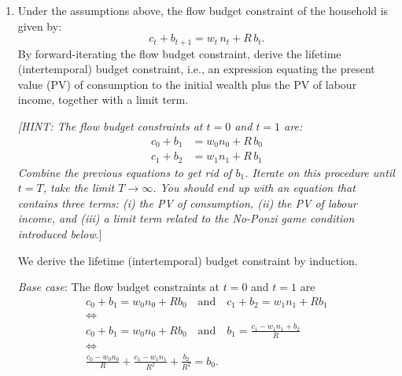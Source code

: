 \documentclass[dvipsnames,11pt]{article}
\begin{document}
        \begin{enumerate}
            \item Under the assumptions above, the flow budget constraint of the household is given by: 
            \begin{equation*}
                c_t + b_{t+1} = w_t\,n_t + R\,b_t .
            \end{equation*}
            By forward-iterating the flow budget constraint, derive the lifetime (intertemporal) budget constraint, i.e., an expression equating the present value (PV) of consumption to the initial wealth plus the PV of labour income, together with a limit term. 

            \textit{[HINT: The flow budget constraints at $t=0$ and $t=1$ are:
            \begin{align*}
            c_{0} + b_1  &= w_0 n_0 + R\,b_{0} 	\\
            c_{1} + b_2  &= w_1 n_1 + R\,b_{1}
            \end{align*}
            Combine the previous equations to get rid of $b_{1}$. Iterate on this
            procedure until $t=T$, take the limit $T\to\infty$. You should end up with an equation that contains three terms: \textit{(i)} the PV of consumption, \textit{(ii)} the PV of labour income, and \textit{(iii)} a limit term related to the No-Ponzi game condition introduced below}.]

            \begin{solution}

               We derive the lifetime (intertemporal) budget constraint by induction. 

\textit{Base case}: The flow budget constraints at $t=0$ and $t=1$ are
\begin{gather*}
    c_0+b_1 = w_0n_0+Rb_0 \quad \mathrm{and} \quad  c_1 +b_2 = w_1n_1+Rb_1 \\ \iff \\ c_0+b_1 = w_0n_0+Rb_0 \quad \mathrm{and} \quad b_1 = \frac{c_1-w_1n_1+b_2}{R} \\ \iff \\ \frac{c_0-w_0n_0}{R}+\frac{c_1-w_1n_1}{R^2}+\frac{b_2}{R^2}= b_0.
\end{gather*}


\end{solution}
\end{enumerate}
\end{document}
